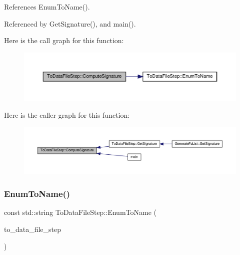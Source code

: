 References Enum\+To\+Name().



Referenced by Get\+Signature(), and main().

Here is the call graph for this function\+:
\nopagebreak
\begin{figure}[H]
\begin{center}
\leavevmode
\includegraphics[width=350pt]{d6/d54/classToDataFileStep_a0e5c20720eaf49db1a8a1e82c00d43f7_cgraph}
\end{center}
\end{figure}
Here is the caller graph for this function\+:
\nopagebreak
\begin{figure}[H]
\begin{center}
\leavevmode
\includegraphics[width=350pt]{d6/d54/classToDataFileStep_a0e5c20720eaf49db1a8a1e82c00d43f7_icgraph}
\end{center}
\end{figure}
\mbox{\label{classToDataFileStep_a6404e3b2da6df6092e064f5d462186d4}} 
\subsubsection{\texorpdfstring{Enum\+To\+Name()}{EnumToName()}}
{\footnotesize\ttfamily const std\+::string To\+Data\+File\+Step\+::\+Enum\+To\+Name (\begin{DoxyParamCaption}\item[{const \hyperlink{to__data__file__step_8hpp_a11e82da7dd30bcde03a139fc0baa4f38}{To\+Data\+File\+Step\+\_\+\+Type}}]{to\+\_\+data\+\_\+file\+\_\+step }\end{DoxyParamCaption})\hspace{0.3cm}{\ttfamily [static]}}



